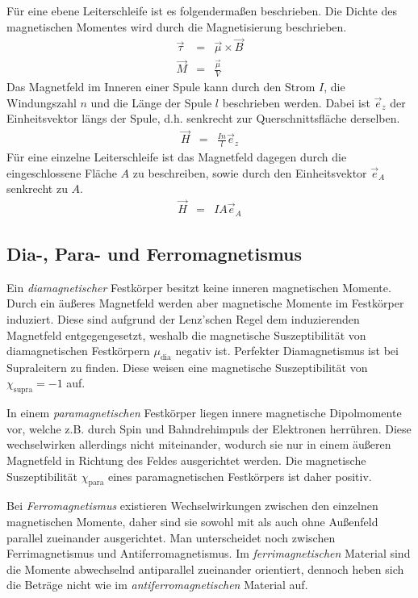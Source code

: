 \documentclass[12pt,a4paper]{scrartcl}
\numberwithin{equation}{section} %
\renewcommand{\[}{} %
\renewcommand{\]}{\noindent} %
\begin{document}
Für eine ebene Leiterschleife ist es folgendermaßen beschrieben. \cite{Jackson}
Die Dichte des magnetischen Momentes wird durch die Magnetisierung beschrieben.
\begin{eqnarray}
    \vec \tau &=& \vec \mu \times \vec B \\
    \vec M &=& \frac{\vec \mu}{V}
\end{eqnarray}
Das Magnetfeld im Inneren einer Spule kann durch den Strom \(I\), die 
Windungszahl \(n\) und die Länge der Spule \(l\) beschrieben werden. Dabei ist \(\vec e_z\) der Einheitsvektor längs der Spule, d.h. senkrecht zur Querschnittsfläche derselben. \cite{Jackson}
\begin{eqnarray}
    \vec H &=& \frac{In}{l} \vec e_z \label{H(I)}
\end{eqnarray}
Für eine einzelne Leiterschleife ist das Magnetfeld dagegen durch die eingeschlossene Fläche \(A\) zu beschreiben, sowie durch den Einheitsvektor \(\vec e_A\) senkrecht zu \(A\).
\begin{eqnarray}
    \vec H &=& IA \vec e_A
\end{eqnarray}

\hypertarget{dia--para--und-ferromagnetismus}{%
\subsection{Dia-, Para- und Ferromagnetismus}\label{dia--para--und-ferromagnetismus}}
Ein \emph{diamagnetischer} Festkörper besitzt keine inneren magnetischen Momente. Durch ein äußeres Magnetfeld werden aber magnetische Momente im Festkörper induziert. Diese sind aufgrund der Lenz'schen Regel dem induzierenden Magnetfeld entgegengesetzt, weshalb die magnetische Suszeptibilität von diamagnetischen Festkörpern \(\mu_\mathrm{dia}\)
negativ ist. Perfekter Diamagnetismus ist bei Supraleitern zu finden. Diese weisen eine magnetische Suszeptibilität von \(\chi_\mathrm{supra} = -1\) auf.

In einem \emph{paramagnetischen} Festkörper liegen innere magnetische Dipolmomente vor, welche z.B. durch Spin und Bahndrehimpuls der Elektronen herrühren. Diese wechselwirken allerdings nicht miteinander, wodurch sie nur in einem äußeren Magnetfeld in Richtung des Feldes ausgerichtet werden. Die magnetische Suszeptibilität \(\chi_\mathrm{para}\) eines paramagnetischen Festkörpers ist daher positiv.

Bei \emph{Ferromagnetismus} existieren Wechselwirkungen zwischen den einzelnen magnetischen Momente, daher sind sie sowohl mit als auch ohne Außenfeld parallel zueinander ausgerichtet. Man unterscheidet noch zwischen Ferrimagnetismus und Antiferromagnetismus. Im \emph{ferrimagnetischen} Material sind die Momente abwechselnd antiparallel zueinander orientiert, dennoch heben sich die Beträge nicht wie im \emph{antiferromagnetischen} Material auf.
\end{document}
